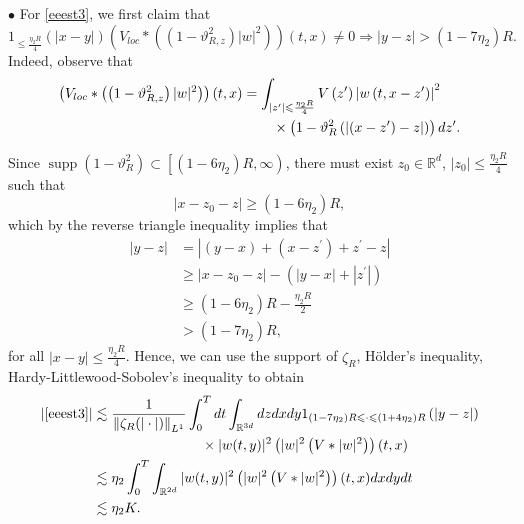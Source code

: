 \documentclass[reqno,11pt]{amsart}
\theoremstyle{plain}
\theoremstyle{definition}
\numberwithin{equation}{section}
\numberwithin{theorem}{section}
\def\geq{\geqslant}
\def\leq{\leqslant}
\def\R{\mathbb{R}}
\begin{document}
$\bullet$ For \eqref{eeest3}, we first claim that
\begin{equation*}
1_{\leq \frac{\eta_{2} R}{4 }}(|x-y|)\left(V_{loc} *\left(\left(1-\vartheta_{R, z}^{2}\right)|w|^{2}\right)\right)(t, x) \neq 0 \Longrightarrow\left| y-z\right|>\left(1-7 \eta_{2}\right) R. 
\end{equation*}
Indeed, observe that
\begin{align*}
\left(V_{loc} *\left(\left(1-\vartheta_{R, z}^{2}\right)|w|^{2}\right)\right)(t, x)&=\int_{\left|z^{\prime}\right| \leq \frac{\eta_{2} R}{4 }} V\left(z^{\prime}\right)\left|w\left(t, x-z^{\prime}\right)\right|^{2}\notag\\
&\hspace{5ex}\times\left(1-\vartheta_{R}^{2}\left(\left|\left(x-z^{\prime}\right)-z\right|\right)\right) d z^{\prime}. 
\end{align*}


Since $\operatorname{supp}\left(1-\vartheta_{R}^{2}\right) \subset\left[\left(1-6 \eta_{2}\right) R, \infty\right)$, there must exist $z_0\in\R^d$, $|z_0|\leq \frac{\eta_2R}{4}$ such that
\begin{equation*}
\left|x-z_0-z\right| \geq\left(1-6 \eta_{2}\right) R, 
\end{equation*}
which by the reverse triangle inequality implies that
\begin{align*}
\left|y-z\right| & =\left|(y-x)+\left(x-z^{\prime}\right)+ z^{\prime}-z\right| \\
& \geq\left|x-z_0-z\right|-\left(|y-x|+\left|z^{\prime}\right|\right) \\
& \geq\left(1-6 \eta_{2}\right) R-\frac{\eta_{2} R}{2} \\
& >\left(1-7 \eta_{2}\right) R,
\end{align*}
for all $|x-y| \leq \frac{\eta_2 R}{4}$. Hence, we can use the support of $\zeta_{R}$, H\"older's inequality, Hardy-Littlewood-Sobolev's inequality to obtain
\begin{align}
    |\eqref{eeest3}|&\lesssim \frac{1}{\left\|\zeta_{R}(|\cdot|)\right\|_{L^{1}}} \int_{0}^{T} d t  \int_{\mathbb{R}^{3d}} d z d x d y 1_{\left(1-7 \eta_{2}\right) R \leq \cdot \leq\left(1+4 \eta_{2}\right) R}\left(\left|y-z\right|\right)\notag\\
&\hspace{18ex}\times|w(t, y)|^{2}\left(|w|^{2}\left(V *|w|^{2}\right)\right)(t, x) \notag\\
&\lesssim \eta_{2} \int_{0}^{T} \int_{\mathbb{R}^{2d}} |w(t, y)|^{2}\left(|w|^{2}\left(V *|w|^{2}\right)\right)(t, x) d x d y d t\notag\\
    &\lesssim \eta_2K.\label{aeeest3}
\end{align}
\end{document}
